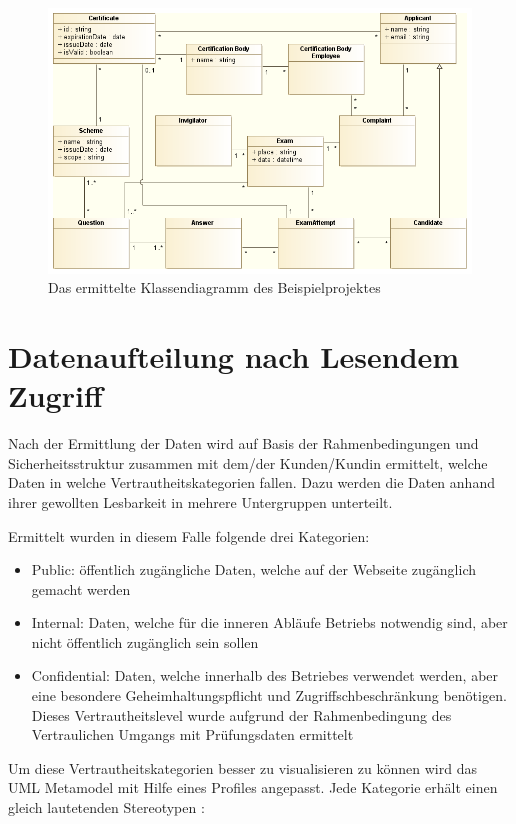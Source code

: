 \begin{figure}[!htbp]
    \centering
    \includegraphics[scale=0.5]{uml/class.png}
    \caption{Das ermittelte Klassendiagramm des Beispielprojektes}
\end{figure}

\section{Datenaufteilung nach Lesendem Zugriff}
Nach der Ermittlung der Daten wird auf Basis der Rahmenbedingungen und Sicherheitsstruktur zusammen mit dem/der Kunden/Kundin ermittelt, welche Daten in welche Vertrautheitskategorien fallen. Dazu werden die Daten anhand ihrer gewollten Lesbarkeit in mehrere Untergruppen unterteilt.

Ermittelt wurden in diesem Falle folgende drei Kategorien:

\begin{itemize}
  \item Public: öffentlich zugängliche Daten, welche auf der Webseite zugänglich gemacht werden
  \item Internal: Daten, welche für die inneren Abläufe Betriebs notwendig sind, aber nicht öffentlich zugänglich sein sollen
  \item Confidential: Daten, welche innerhalb des Betriebes verwendet werden, aber eine besondere Geheimhaltungspflicht und Zugriffschbeschränkung benötigen. Dieses Vertrautheitslevel wurde aufgrund der Rahmenbedingung des Vertraulichen Umgangs mit Prüfungsdaten ermittelt \cite[7.3]{ISO_CERT}
\end{itemize}

Um diese Vertrautheitskategorien besser zu visualisieren zu können wird das UML Metamodel mit Hilfe eines Profiles angepasst. Jede Kategorie erhält einen gleich lautetenden Stereotypen \cite[S. 518]{glasklar}:

